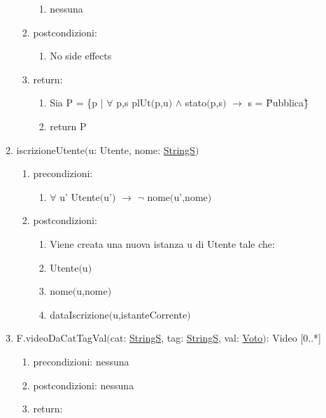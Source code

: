 \documentclass{article}
\begin{document}
\begin{enumerate}
\begin{enumerate}
\begin{enumerate}
\begin{enumerate}
                \item nessuna
            \end{enumerate}
            \item postcondizioni:
            \begin{enumerate}
                \item No side effects
            \end{enumerate}
            \item return:
            \begin{enumerate}
                \item Sia P = \{p $|$ $\forall$ p,s plUt$($p,u$)$ $\land$ stato$($p,s$)$ $\rightarrow$ s = \"Pubblica\"\}
                \item return P
            \end{enumerate}
        \end{enumerate}
        \item iscrizioneUtente$($u: Utente, nome: \hyperref[sec:TipoStringS]{StringS}$)$
        \begin{enumerate}
            \item precondizioni:
            \begin{enumerate}
                \item $\forall$ u' Utente$($u'$)$ $\rightarrow$ $\neg$ nome$($u',nome$)$
            \end{enumerate}
            \item postcondizioni:
            \begin{enumerate}
                \item Viene creata una nuova istanza u di Utente tale che:
                \item Utente$($u$)$
                \item nome$($u,nome$)$
                \item dataIscrizione$($u,istanteCorrente$)$
            \end{enumerate}
        \end{enumerate}
        \item F.videoDaCatTagVal$($cat: \hyperref[sec:TipoStringS]{StringS}, tag: \hyperref[sec:TipoStringS]{StringS}, val: \hyperref[sec:TipoVoto]{Voto}$)$: Video [0..*]
        \begin{enumerate}
            \item precondizioni: nessuna
            \item postcondizioni: nessuna
            \item return:

\end{enumerate}
\end{enumerate}
\end{enumerate}
\end{document}
